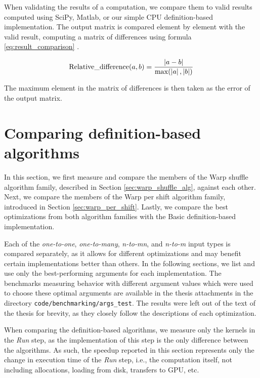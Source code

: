 When validating the results of a computation, we compare them to valid results computed using SciPy, Matlab, or our simple CPU definition-based implementation. The output matrix is compared element by element with the valid result, computing a matrix of differences using formula \ref{eq:result_comparison} \citep{wiki:relative_difference}.

\begin{equation}
\label{eq:result_comparison}
\mathrm{Relative\_difference }(a, b) = \frac{\left|{a - b}\right|}{\max(\left|{a}\right|, \left|{b}\right|)}
\end{equation}

The maximum element in the matrix of differences is then taken as the error of the output matrix.

\section{Comparing definition-based algorithms}
\label{sec:results_definition_based}

In this section, we first measure and compare the members of the Warp shuffle algorithm family, described in Section \ref{sec:warp_shuffle_alg}, against each other. Next, we compare the members of the Warp per shift algorithm family, introduced in Section \ref{sec:warp_per_shift}. Lastly, we compare the best optimizations from both algorithm families with the Basic definition-based implementation.


Each of the \textit{one-to-one}, \textit{one-to-many}, \textit{n-to-mn}, and \textit{n-to-m} input types is compared separately, as it allows for different optimizations and may benefit certain implementations better than others. In the following sections, we list and use only the best-performing arguments for each implementation. The benchmarks measuring behavior with different argument values which were used to choose these optimal arguments are available in the thesis attachments in the directory \texttt{code/benchmarking/args\_test}. The results were left out of the text of the thesis for brevity, as they closely follow the descriptions of each optimization.  

When comparing the definition-based algorithms, we measure only the kernels in the \textit{Run} step, as the implementation of this step is the only difference between the algorithms. As such, the speedup reported in this section represents only the change in execution time of the \textit{Run} step, i.e., the computation itself, not including allocations, loading from disk, transfers to GPU, etc.

